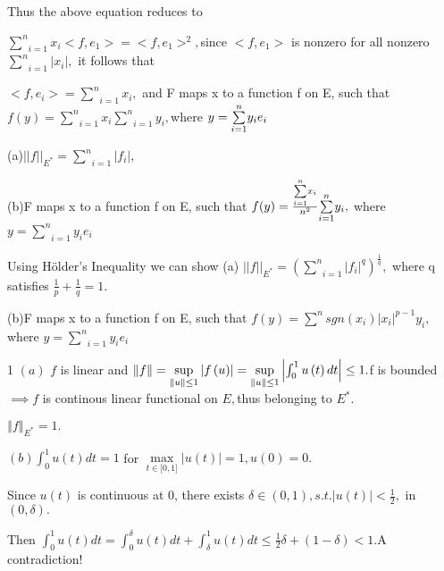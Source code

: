 \documentclass{article}
\begin{document}
Thus the above equation reduces to

$\underset{i=1}{\overset{n}{\sum }}x_{i}<f,e_{1}>=<f,e_{1}>^{2},$since $%
<f,e_{1}>$ is nonzero for all nonzero $\underset{i=1}{\overset{n}{\sum }}%
|x_{i}|,$ it follows that

$<f,e_{i}>=\underset{i=1}{\overset{n}{\sum }}x_{i},$ and F maps x to a
function f on E, such that $f(y)=\underset{i=1}{\overset{n}{\sum }}x_{i}%
\underset{i=1}{\overset{n}{\sum }}y_{i},$where $y=\underset{i=1}{\overset{n}{%
\sum }}y_{i}e_{i}$


(a)$||f||_{E^{\ast }}=\underset{i=1}{\overset{n}{\sum }}|f_{i}|,$

(b)F maps x to a function f on E, such that $f(y)=\frac{\underset{i=1}{%
\overset{n}{\sum }}x_{i}}{n^{2}}\underset{i=1}{\overset{n}{\sum }}y_{i},$%
where $y=\underset{i=1}{\overset{n}{\sum }}y_{i}e_{i}$


Using H\"{o}lder's Inequality we can show (a) $||f||_{E^{\ast }}=\left( 
\underset{i=1}{\overset{n}{\sum }}|f_{i}|^{q}\right) ^{\frac{1}{q}},$ where
q satisfies $\frac{1}{p}+\frac{1}{q}=1.$

(b)F maps x to a function f on E, such that $f(y)=\overset{n}{\sum }%
sgn(x_{i})|x_{i}|^{p-1}y_{i},$where $y=\underset{i=1}{\overset{n}{\sum }}%
y_{i}e_{i}$


1 $\left( a\right) $ $f$ is linear and $\left\Vert f\right\Vert =\underset{%
\left\Vert u\right\Vert \leq 1}{\sup }\left\vert f\left( u\right)
\right\vert =\underset{\left\Vert u\right\Vert \leq 1}{\sup }\left\vert
\int_{0}^{1}u\left( t\right) dt\right\vert \leq 1.$f is bounded$\implies f$
is continous linear functional on $E,$thus belonging to $E^{\ast }.$

$\left\Vert f\right\Vert _{E^{\ast }}=1.$

$\left( b\right) \int_{0}^{1}u\left( t\right) dt=1$ for $\underset{t\in
\lbrack 0,1]}{\max }\left\vert u\left( t\right) \right\vert =1,u\left(
0\right) =0.$

Since $u\left( t\right) $ is continuous at 0, there exists $\delta \in
\left( 0,1\right) ,s.t.\left\vert u\left( t\right) \right\vert <\frac{1}{2},$%
in $\left( 0,\delta \right) .$

Then $\int_{0}^{1}u\left( t\right) dt=\int_{0}^{\delta }u\left( t\right)
dt+\int_{\delta }^{1}u\left( t\right) dt\leq \frac{1}{2}\delta +\left(
1-\delta \right) <1.$A contradiction!
\end{document}
